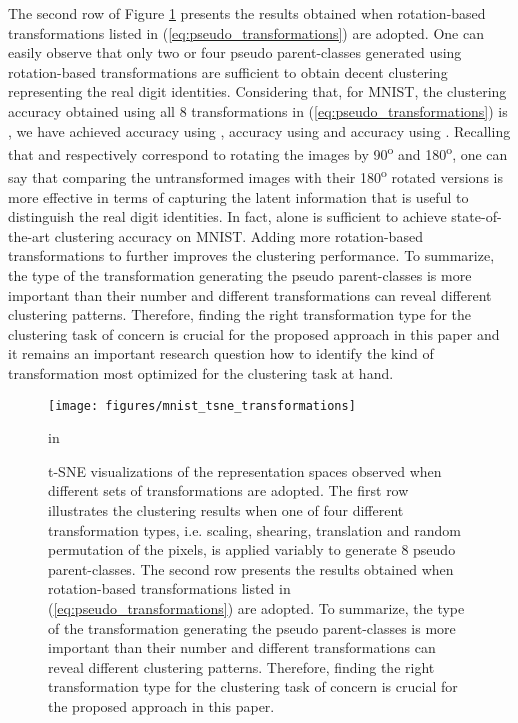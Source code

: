 \documentclass{article} \usepackage{iclr2018_conference,times}
\begin{document}
The second row of Figure \ref{fig:pseudo_impact_trans} presents the results obtained when rotation-based transformations listed in (\ref{eq:pseudo_transformations}) are adopted. One can easily observe that only two or four pseudo parent-classes generated using rotation-based transformations are sufficient to obtain decent clustering representing the real digit identities. Considering that, for MNIST, the clustering accuracy obtained using all 8 transformations in (\ref{eq:pseudo_transformations}) is , we have achieved  accuracy using ,  accuracy using  and  accuracy using . Recalling that  and  respectively correspond to rotating the images by 90\textsuperscript{o} and 180\textsuperscript{o}, one can say that comparing the untransformed images with their 180\textsuperscript{o} rotated versions is more effective in terms of capturing the latent information that is useful to distinguish the real digit identities. In fact,  alone is sufficient to achieve state-of-the-art clustering accuracy on MNIST. Adding more rotation-based transformations to  further improves the clustering performance. To summarize, the type of the transformation generating the pseudo parent-classes is more important than their number and different transformations can reveal different clustering patterns. Therefore, finding the right transformation type for the clustering task of concern is crucial for the proposed approach in this paper and it remains an important research question how to identify the kind of transformation most optimized for the clustering task at hand. 
\begin{figure}[h]
	\begin{center}
		\centerline{\texttt{[image: figures/mnist\_tsne\_transformations]}}
		\caption{t-SNE visualizations of the representation spaces observed when different sets of transformations are adopted. The first row illustrates the clustering results when one of four different transformation types, i.e. scaling, shearing, translation and random permutation of the pixels, is applied variably to generate 8 pseudo parent-classes. The second row presents the results obtained when rotation-based transformations listed in (\ref{eq:pseudo_transformations}) are adopted. To summarize, the type of the transformation generating the pseudo parent-classes is more important than their number and different transformations can reveal different clustering patterns. Therefore, finding the right transformation type for the clustering task of concern is crucial for the proposed approach in this paper.}
		\label{fig:pseudo_impact_trans}
	\end{center}
	 in
\end{figure}
\end{document}
